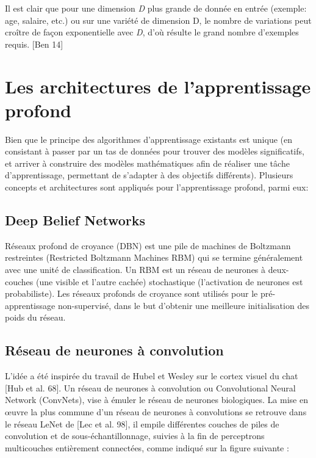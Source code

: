 	Il est clair que pour une dimension \textit{D} plus grande de donnée en entrée (exemple: age, salaire, etc.) ou sur une variété de dimension D, le nombre de variations peut croître de façon exponentielle avec \textit{D}, d'où résulte le grand nombre d'exemples requis. [Ben 14]

\section{Les architectures de l'apprentissage profond}

	Bien que le principe des algorithmes d'apprentissage existants est unique (en consistant à passer par un tas de données pour trouver des modèles significatifs, et arriver à construire des modèles mathématiques afin de réaliser une tâche d'apprentissage, permettant de s'adapter à des objectifs différents). Plusieurs concepts et architectures sont appliqués pour l'apprentissage profond, parmi eux:

\subsection{Deep Belief Networks}

	Réseaux profond de croyance (DBN) est une pile de machines de Boltzmann restreintes (Restricted Boltzmann Machines RBM) qui se termine généralement avec une unité de classification. Un RBM est un réseau de neurones à deux-couches (une visible et l'autre cachée) stochastique (l'activation de neurones est probabiliste).
Les réseaux profonds de croyance sont utilisés pour le pré-apprentissage non-supervisé, dans le but d'obtenir une meilleure initialisation des poids du réseau.


\subsection{Réseau de neurones à convolution}
	
	L'idée a été inspirée du travail de Hubel et Wesley sur le cortex visuel du chat [Hub et al. 68]. Un réseau de neurones à convolution ou Convolutional Neural Network (ConvNets), vise à émuler le réseau de neurones biologiques.
	La mise en œuvre la plus commune d'un réseau de neurones à convolutions se retrouve dans le réseau LeNet de [Lec et al. 98], il empile différentes couches de piles de convolution et de sous-échantillonnage, suivies à la fin de perceptrons multicouches entièrement connectées, comme indiqué sur la figure suivante :

